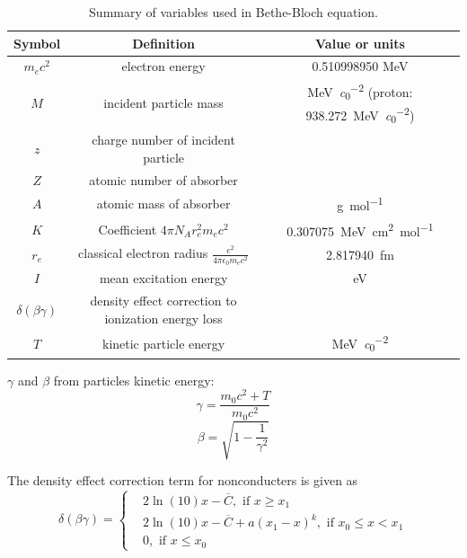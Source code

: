 \documentclass{article}
\begin{document}
\begin{table}[h]
    \centering
    \begin{tabular}{c|c|c}
         Symbol & Definition & Value or units\\
         \hline
         $m_ec^2$ & electron energy & 0.510998950 MeV\\
         $M$ & incident particle mass & \si{\mega\electronvolt\per\clight\squared} (proton: \SI{938.272}{\mega\electronvolt\per\clight\squared}) \\
         $z$ &charge number of incident particle & \\
         $Z$ & atomic number of absorber & \\
         $A$ & atomic mass of absorber & \si{\gram\per\mol}\\
         $K$ & Coefficient $4\pi N_A r_e^2m_ec^2$ & \SI{0.307075}{\mega\electronvolt\centi\meter\squared\per\mol} \\
         $r_e$ & classical electron radius $\frac{e^2}{4\pi \epsilon_0 m_e c^2}$ & \SI{2.817940}{\femto\meter} \\
         $I$ & mean excitation energy & \si{\electronvolt}\\
         $\delta(\beta\gamma)$ & density effect correction to ionization energy loss & \\
         $T$ & kinetic particle energy & \si{\mega\electronvolt\per\clight\squared}
    \end{tabular}
    \caption{Summary of variables used in Bethe-Bloch equation.}
    \label{table:bethe:variables}
\end{table}

$\gamma$ and $\beta$ from particles kinetic energy:
\begin{equation}
    \gamma = \frac{m_0c^2+T}{m_0c^2}
\end{equation}
\begin{equation}
    \beta = \sqrt{1-\frac{1}{\gamma^2}}
\end{equation}

The density effect correction term for nonconducters is given as
\begin{equation}
    \delta(\beta\gamma) =
    \begin{cases} & 2\ln(10)x-\overline{C}, \text{ if } x \geq x_1\\
        &2\ln(10)x-\overline{C} + a(x_1-x)^k, \text{ if } x_0 \leq x < x_1\\
        & 0, \text{ if } x \leq x_0
    \end{cases}
\end{equation}
\end{document}
